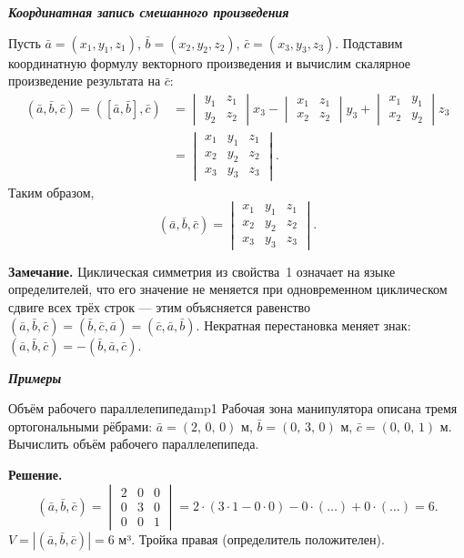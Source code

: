 \documentclass[12pt,a4paper]{article}
\newcommand{\va}{\bar{a}}
\newcommand{\vb}{\bar{b}}
\newcommand{\vc}{\bar{c}}
\begin{document}
\medskip

\textbf{\textit{Координатная запись смешанного произведения}}

Пусть $\va=(x_1,y_1,z_1)$, $\vb=(x_2,y_2,z_2)$, $\vc=(x_3,y_3,z_3)$.
Подставим координатную формулу векторного произведения и вычислим
скалярное произведение результата на $\vc$:
\begin{align*}
  (\va,\vb,\vc) = ([\va,\vb],\vc)
  &=
  \begin{vmatrix}y_1&z_1\\y_2&z_2
  \end{vmatrix}x_3
  -
  \begin{vmatrix}x_1&z_1\\x_2&z_2
  \end{vmatrix}y_3
  +
  \begin{vmatrix}x_1&y_1\\x_2&y_2
  \end{vmatrix}z_3 \\
  &=
  \begin{vmatrix}
    x_1 & y_1 & z_1 \\
    x_2 & y_2 & z_2 \\
    x_3 & y_3 & z_3
  \end{vmatrix}.
\end{align*}
Таким образом,
\begin{equation}
  \boxed{(\va,\vb,\vc) =
    \begin{vmatrix}
      x_1 & y_1 & z_1 \\
      x_2 & y_2 & z_2 \\
      x_3 & y_3 & z_3
  \end{vmatrix}.} \tag{8.7}
\end{equation}

\noindent
\textbf{Замечание.} Циклическая симметрия из свойства~1 означает
на языке определителей, что его значение не меняется при
одновременном циклическом сдвиге всех трёх строк --- этим
объясняется равенство
$(\va,\vb,\vc) = (\vb,\vc,\va) = (\vc,\va,\vb)$.
Некратная перестановка меняет знак:
$(\va,\vb,\vc) = -(\vb,\va,\vc)$.

\medskip

\textbf{\textit{Примеры}}

\begin{exampleBox}{Объём рабочего параллелепипеда}{mp1}
  Рабочая зона манипулятора описана тремя ортогональными рёбрами:
  $\va=(2,\,0,\,0)$ м, $\vb=(0,\,3,\,0)$ м, $\vc=(0,\,0,\,1)$ м.
  Вычислить объём рабочего параллелепипеда.

  \textbf{Решение.}
  \[
    (\va,\vb,\vc) =
    \begin{vmatrix}
      2 & 0 & 0 \\
      0 & 3 & 0 \\
      0 & 0 & 1
    \end{vmatrix}
    = 2\cdot(3\cdot1 - 0\cdot0)
    - 0\cdot(\ldots)
    + 0\cdot(\ldots) = 6.
  \]
  $V = |(\va,\vb,\vc)| = 6$ м³. Тройка правая (определитель положителен).
\end{exampleBox}
\end{document}

